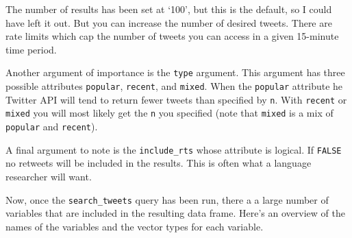 \documentclass[
  letterpaper,
]{latex/krantz}
\begin{document}
The number of results has been set at `100', but this is the default, so
I could have left it out. But you can increase the number of desired
tweets. There are rate limits which cap the number of tweets you can
access in a given 15-minute time period.

Another argument of importance is the \texttt{type} argument. This
argument has three possible attributes \texttt{popular},
\texttt{recent}, and \texttt{mixed}. When the \texttt{popular} attribute
he Twitter API will tend to return fewer tweets than specified by
\texttt{n}. With \texttt{recent} or \texttt{mixed} you will most likely
get the \texttt{n} you specified (note that \texttt{mixed} is a mix of
\texttt{popular} and \texttt{recent}).

A final argument to note is the \texttt{include\_rts} whose attribute is
logical. If \texttt{FALSE} no retweets will be included in the results.
This is often what a language researcher will want.

Now, once the \texttt{search\_tweets} query has been run, there a a
large number of variables that are included in the resulting data frame.
Here's an overview of the names of the variables and the vector types
for each variable.
\end{document}
